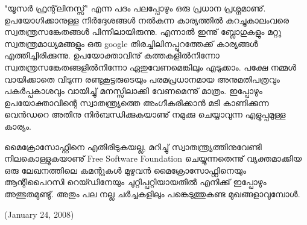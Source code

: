 "യൂസര്‍ ഫ്രന്റ്‌ലിനസ്സ്" എന്ന പദം പലപ്പോഴും ഒരു പ്രധാന പ്രശ്നമാണു്. ഉപയോഗിക്കാനുള്ള നിര്‍‌ദ്ദേശങ്ങള്‍ നല്‍കുന്ന കാര്യത്തില്‍ 
കുറച്ചുകാലംവരെ സ്വതന്ത്രസങ്കേതങ്ങള്‍ പിന്നിലായിരുന്നു. എന്നാല്‍ ഇന്നു് ബ്ലോഗുകളും മറ്റു സ്വതന്ത്രമാധ്യമങ്ങളും ഒരു google 
തിരച്ചിലിനപ്പുറത്തേക്ക് കാര്യങ്ങള്‍ എത്തിച്ചിരിക്കുന്നു. ഉപയോക്താവിനു് കുത്തകളില്‍നിന്നോ സ്വതന്ത്രസങ്കേതങ്ങളില്‍നിന്നോ 
ഏതുവേണമെങ്കിലും എടുക്കാം. പക്ഷേ നമ്മള്‍ വായിക്കാതെ വിടുന്ന രണ്ടുകൂട്ടരുടെയും പരമപ്രധാനമായ അനുമതിപത്രവും 
പകര്‍പ്പകാശവും വായിച്ചു് മനസ്സിലാക്കി വേണമെന്നു് മാത്രം. ഇപ്പോഴും ഉപയോക്താവിന്റെ സ്വാതന്ത്ര്യത്തെ അംഗീകരിക്കാന്‍ മടി 
കാണിക്കുന്ന വെന്‍ഡറെ അതിനു നിര്‍ബന്ധിക്കുകയാണു് നമുക്കു ചെയ്യാവുന്ന എളുപ്പമുള്ള കാര്യം.

മൈക്രോസോഫ്റ്റിനെ എതിരിടുകയല്ല, മറിച്ചു് സ്വാതന്ത്ര്യത്തിനുവേണ്ടി നിലകൊള്ളുകയാണു് Free Software Foundation 
ചെയ്യുന്നതെന്നു് വ്യക്തമാക്കിയ ഒരു ലേഖനത്തിലെ കമന്റുകള്‍ മുഴുവന്‍ മൈക്രോസോഫ്റ്റിനെയും ആന്റിപൈറസി റെയ്ഡിനേയും 
ചുറ്റിപ്പറ്റിയായതില്‍ എനിക്കു് ഇപ്പോഴും അത്ഭുതമുണ്ടു്. അതും പല നല്ല ചര്‍ച്ചകളിലും പങ്കെടുത്തുകണ്ട മുഖങ്ങളാവുമ്പോള്‍.


(January 24, 2008)
\newpage
